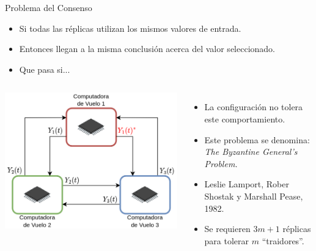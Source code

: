 \begin{frame}{Problema del Consenso}
	\begin{itemize}
		\item Si todas las réplicas utilizan los mismos valores de entrada.
		\item Entonces llegan a la misma conclusión acerca del valor seleccionado.
		\item Que pasa si...
	\end{itemize}
	\begin{columns}
			\includegraphics[width=\textwidth]{img/consenso.png}
			\begin{itemize}
				\item La configuración no tolera este comportamiento.
				\item Este problema se denomina: \textit{The Byzantine General's Problem.}
				\item Leslie Lamport, Rober Shostak y Marshall Pease, 1982.
				\item Se requieren $3m+1$ réplicas para tolerar $m$ ``traidores''.
			\end{itemize}
	\end{columns}
\end{frame}

